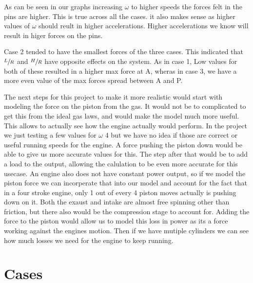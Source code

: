 \documentclass[nofoot,pdf-a,balance,colorlinks,upint,subscriptcorrection,varvw,mathalfa=cal=boondoxo]{asmeconf}
\begin{document}
	As can be seen in our graphs increasing $\omega$ to higher speeds the forces felt in the pins are higher. This is true across all the cases. it also makes sense as higher values of $\omega$ should reult in higher accelerations. Higher accelerations we know will result in higer forces on the pins.

	Case 2 tended to have the smallest forces of the three cases. This indicated that $\sfrac{L}{R}$ and $\sfrac{H}{R}$ have opposite effects on the system. As in case 1, Low values for both of these resulted in a higher max force at A, wheras in case 3, we have a more even value of the max forces spread between A and P.

	The next steps for this project to make it more realistic would start with modeling the force on the piston from the gas. It would not be to complicated to get this from the ideal gas laws, and would make the model much more useful. This allows to actually see how the engine actually would perform. In the project we just testing a few values for $\omega$ 4 but we have no idea if those are correct or useful running speeds for the engine. A force pushing the piston down would be able to give us more accurate values for this. The step after that would be to add a load to the output, allowing the calulation to be even more accurate for this usecase. An engine also does not have constant power output, so if we model the piston force we can incorperate that into our model and account for the fact that in a four stroke engine, only 1 out of every 4 piston moves actually is pushing down on it. Both the exaust and intake are almost free spinning other than friction, but there also would be the compression stage to account for. Adding the force to the piston would allow us to model this loss in power as its a force working against the engines motion. Then if we have mutiple cylinders we can see how much losses we need for the engine to keep running. 


    \appendix
    \section{Cases}\label{appendix:cases}
	  \begin{table}[H]
        \caption[Table]{Cases to consider (Given)}\label{tab:givenCases}
    \end{table}
\end{document}
